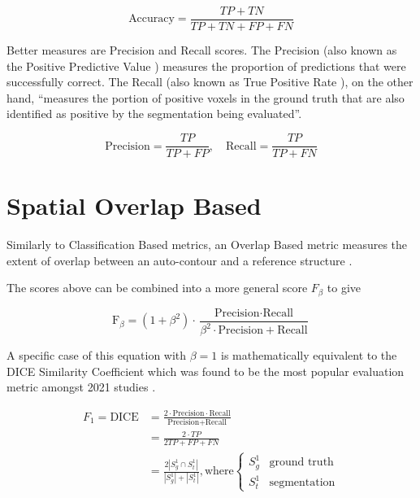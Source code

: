 \documentclass[11pt,twoside]{report}
\begin{document}
\begin{equation*}
  \text{Accuracy} = \frac{TP + TN}{TP + TN + FP + FN}
\end{equation*}

Better measures are Precision and Recall scores. The Precision (also known as the Positive Predictive Value \cite{evaluation-metrics}) measures the proportion of predictions that were successfully correct. The Recall (also known as True Positive Rate \cite{evaluation-metrics}), on the other hand, ``measures the portion of positive voxels in the ground truth that are also identified as positive by the segmentation being evaluated''.

\begin{equation*}
  \text{Precision} = \frac{TP}{TP+FP}, \quad \text{Recall} = \frac{TP}{TP+FN}
\end{equation*}

\section{Spatial Overlap Based}

Similarly to Classification Based metrics, an Overlap Based metric measures the extent of overlap between an auto-contour and a reference structure \cite{review-metrics}. 

The scores above can be combined into a more general score $F_\beta$ to give 

\begin{equation*}
  \text{F}_\beta = (1+\beta^2)\cdot \frac{\text{Precision} \cdot \text{Recall}}{\beta^2 \cdot \text{Precision}+\text{Recall}}
\end{equation*}

A specific case of this equation with $\beta=1$ is mathematically equivalent to the DICE Similarity Coefficient which was found to be the most popular evaluation metric amongst 2021 studies \cite{review-metrics,evaluation-metrics}. 

\begin{align*}
  F_1 = \text{DICE} & = \frac{2 \cdot \text{Precision} \cdot \text{Recall}} {\text{Precision} + \text{Recall}} \\ 
  & = \frac{2 \cdot TP}{2TP + FP + FN} \\ 
  & = \frac{2|S_g^1\cap S_t^1|}{|S_g^1|+|S_t^1|} , \text{where} \begin{cases}
    S_g^1 & \text{ground truth} \\
    S_t^1 & \text{segmentation}
  \end{cases}
\end{align*}
\end{document}
